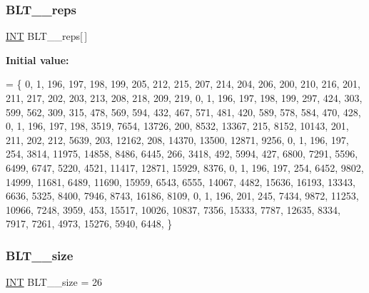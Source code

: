 \mbox{\label{data___b_l_t_8_c_adae16d8c63df00918f524eee74df2c3c}} 
\subsubsection{\texorpdfstring{B\+L\+T\+\_\+\_\+reps}{BLT\_25\_reps}}
{\footnotesize\ttfamily \mbox{\hyperlink{galois_8h_a09fddde158a3a20bd2dcadb609de11dc}{I\+NT}} B\+L\+T\+\_\+\_\+reps\mbox{[}$\,$\mbox{]}}

{\bfseries Initial value\+:}
\begin{DoxyCode}
= \{
    0, 1, 196, 197, 198, 199, 205, 212, 215, 207, 214, 204, 206, 200, 210, 216, 201, 211, 217, 202, 203, 
      213, 208, 218, 209, 219, 
    0, 1, 196, 197, 198, 199, 297, 424, 303, 599, 562, 309, 315, 478, 569, 594, 432, 467, 571, 481, 420, 
      589, 578, 584, 470, 428, 
    0, 1, 196, 197, 198, 3519, 7654, 13726, 200, 8532, 13367, 215, 8152, 10143, 201, 211, 202, 212, 5639, 
      203, 12162, 208, 14370, 13500, 12871, 9256, 
    0, 1, 196, 197, 254, 3814, 11975, 14858, 8486, 6445, 266, 3418, 492, 5994, 427, 6800, 7291, 5596, 6499,
       6747, 5220, 4521, 11417, 12871, 15929, 8376, 
    0, 1, 196, 197, 254, 6452, 9802, 14999, 11681, 6489, 11690, 15959, 6543, 6555, 14067, 4482, 15636, 
      16193, 13343, 6636, 5325, 8400, 7946, 8743, 16186, 8109, 
    0, 1, 196, 201, 245, 7434, 9872, 11253, 10966, 7248, 3959, 453, 15517, 10026, 10837, 7356, 15333, 7787,
       12635, 8334, 7917, 7261, 4973, 15276, 5940, 6448, 
\}
\end{DoxyCode}
\mbox{\label{data___b_l_t_8_c_a16af21f0f925fd1434540b1ccebc143f}} 
\subsubsection{\texorpdfstring{B\+L\+T\+\_\+\_\+size}{BLT\_25\_size}}
{\footnotesize\ttfamily \mbox{\hyperlink{galois_8h_a09fddde158a3a20bd2dcadb609de11dc}{I\+NT}} B\+L\+T\+\_\+\_\+size = 26}

